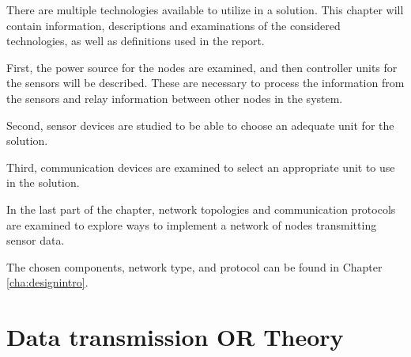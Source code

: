 \label{cha:technologies}
There are multiple technologies available to utilize in a solution. This chapter will contain information, descriptions and examinations of the considered technologies, as well as definitions used in the report.

First, the power source for the nodes are examined, and then controller units for the sensors will be described. These are necessary to process the information from the sensors and relay information between other nodes in the system.

Second, sensor devices are studied to be able to choose an adequate unit for the solution.

Third, communication devices are examined to select an appropriate unit to use in the solution. 

In the last part of the chapter, network topologies and communication protocols are examined to explore ways to implement a network of nodes transmitting sensor data.

The chosen components, network type, and protocol can be found in Chapter \ref{cha:designintro}.













\chapter{Data transmission OR Theory}



